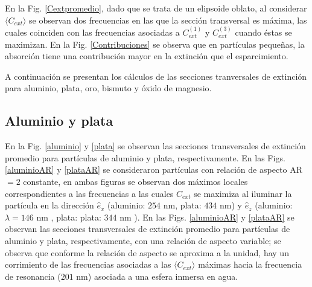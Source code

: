  En la Fig. \ref{Cextpromedio}, dado que se trata de un elipsoide oblato, al considerar $\langle C_{ext}\rangle$ se observan dos frecuencias en las que la sección transversal es máxima, las cuales coinciden con las frecuencias asociadas a $C_{ext}^{(1)}$ y $C_{ext}^{(3)}$ cuando éstas se maximizan. En la Fig. \ref{Contribuciones} se observa que en partículas pequeñas, la absorción tiene una contribución mayor en la extinción que el esparcimiento.

A continuación se presentan los cálculos de las secciones tranversales de extinción para aluminio, plata, oro, bismuto y óxido de magnesio.



\subsection*{Aluminio y plata}
En la Fig. \ref{aluminio} y \ref{plata} se observan las secciones transversales de extinción promedio para partículas de aluminio y plata, respectivamente. En las Figs. \ref{aluminioAR} y \ref{plataAR} se consideraron partículas con relación de aspecto AR$=2$ constante, en ambas figuras se observan dos máximos locales correspondientes a las frecuencias a las cuales $C_{ext}$ se maximiza al iluminar la partícula en la dirección $\hat{e}_x$ (aluminio: $254\text{ nm}$, plata: $434\text{ nm}$) y $\hat{e}_z$ (aluminio: $\lambda=146\text{ nm}$ , plata: plata: $344\text{ nm}$ ).  En las Figs. \ref{aluminioAR}  y \ref{plataAR} se observan las secciones transversales de extinción promedio para partículas de aluminio y plata, respectivamente, con una relación de aspecto variable; se observa que conforme la relación de aspecto se aproxima a la unidad, hay un corrimiento de las frecuencias asociadas a las $\langle C_{ext}\rangle$ máximas hacia la frecuencia de resonancia ($201\text{ nm}$) asociada a una esfera  inmersa en agua.

